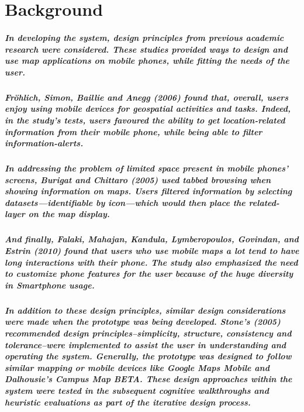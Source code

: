 \documentclass{report}
\begin{document}
\chapter{Background}
    \paragraph{In developing the system, design principles from previous
    academic research were considered. These studies provided ways to design and use
    map applications on mobile phones, while fitting the needs of the user.}
    \paragraph{Fröhlich, Simon, Baillie and Anegg (2006) found that, overall,
    users enjoy using mobile devices for geospatial activities and tasks. Indeed, in
    the study's tests, users favoured the ability to get location-related
    information from their mobile phone, while being able to filter
    information-alerts.}
    \paragraph{In addressing the problem of limited space present in mobile
    phones’ screens, Burigat and Chittaro (2005) used tabbed browsing when showing
    information on maps. Users filtered information by selecting
    datasets—identifiable by icon—which would then place the related-layer on the
    map display.}
    \paragraph{And finally, Falaki, Mahajan, Kandula, Lymberopoulos, Govindan,
    and Estrin (2010) found that users who use mobile maps a lot tend to have long
    interactions with their phone. The study also emphasized the need to customize
    phone features for the user because of the huge diversity in Smartphone usage.}
    \paragraph{In addition to these design principles, similar design
    considerations were made when the prototype was being developed. Stone's (2005)
    recommended design principles--simplicity, structure, consistency and
    tolerance--were implemented to assist the user in understanding and operating
    the system. Generally, the prototype was designed to follow similar mapping or
    mobile devices like Google Maps Mobile and Dalhousie’s Campus Map BETA. These
    design approaches within the system were tested in the subsequent cognitive
    walkthroughs and heuristic evaluations as part of the iterative design process.}
\end{document}

